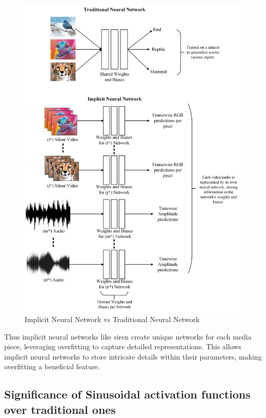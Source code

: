 \documentclass{ioereport}
\begin{document}
    \begin{figure}[H]
        \centering
        \includegraphics[width=0.95\linewidth]{assets/why overfitting.png}
        \caption{Implicit Neural Network vs Traditional Neural Network}
        \label{fig:implicit-vs-traditional}
    \end{figure}

    Thus implicit neural networks like \gls{siren} create unique networks for each media piece, leveraging overfitting to capture detailed representations. This allows implicit neural networks to store intricate details within their parameters, making overfitting a beneficial feature.
    
    
    \subsection{Significance of Sinusoidal activation functions over traditional ones}
\end{document}
